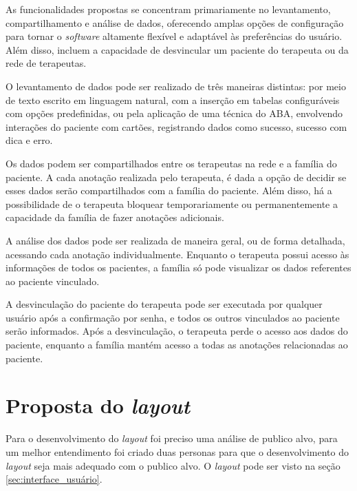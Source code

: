 As funcionalidades propostas se concentram primariamente no levantamento, compartilhamento 
e análise de dados, oferecendo amplas opções de configuração para tornar o \textit{software} altamente 
flexível e adaptável às preferências do usuário. Além disso, incluem a capacidade de desvincular um 
paciente do terapeuta ou da rede de terapeutas.

O levantamento de dados pode ser realizado de três maneiras distintas: por meio de texto 
escrito em linguagem natural, com a inserção em tabelas configuráveis com opções predefinidas, 
ou pela aplicação de uma técnica do ABA, envolvendo interações do paciente com cartões, 
registrando dados como sucesso, sucesso com dica e erro.

Os dados podem ser compartilhados entre os terapeutas na rede e a família do paciente. 
A cada anotação realizada pelo terapeuta, é dada a opção de decidir se esses dados serão 
compartilhados com a família do paciente. Além disso, há a possibilidade de o terapeuta 
bloquear temporariamente ou permanentemente a capacidade da família de fazer anotações adicionais.

A análise dos dados pode ser realizada de maneira geral, ou de forma detalhada, acessando 
cada anotação individualmente. Enquanto o terapeuta possui acesso às informações de todos os 
pacientes, a família só pode visualizar os dados referentes ao paciente vinculado.

A desvinculação do paciente do terapeuta pode ser executada por qualquer usuário após a 
confirmação por senha, e todos os outros vinculados ao paciente serão informados. 
Após a desvinculação, o terapeuta perde o acesso aos dados do paciente, enquanto a família mantém 
acesso a todas as anotações relacionadas ao paciente.

\section{Proposta do \textit{layout}}

Para o desenvolvimento do \textit{layout} foi preciso uma análise de publico alvo, 
para um melhor entendimento foi criado duas personas para que o desenvolvimento do 
\textit{layout} seja mais adequado com o publico alvo. O \textit{layout} pode ser 
visto na seção \ref{sec:interface_usuário}.




